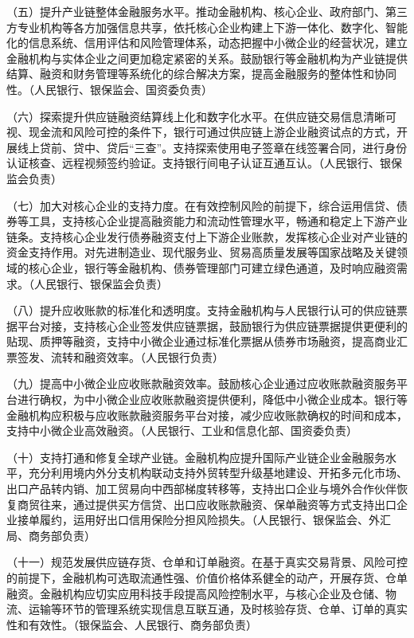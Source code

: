 （五）提升产业链整体金融服务水平。推动金融机构、核心企业、政府部门、第三方专业机构等各方加强信息共享，依托核心企业构建上下游一体化、数字化、智能化的信息系统、信用评估和风险管理体系，动态把握中小微企业的经营状况，建立金融机构与实体企业之间更加稳定紧密的关系。鼓励银行等金融机构为产业链提供结算、融资和财务管理等系统化的综合解决方案，提高金融服务的整体性和协同性。（人民银行、银保监会、国资委负责）

（六）探索提升供应链融资结算线上化和数字化水平。在供应链交易信息清晰可视、现金流和风险可控的条件下，银行可通过供应链上游企业融资试点的方式，开展线上贷前、贷中、贷后“三查”。支持探索使用电子签章在线签署合同，进行身份认证核查、远程视频签约验证。支持银行间电子认证互通互认。（人民银行、银保监会负责）

（七）加大对核心企业的支持力度。在有效控制风险的前提下，综合运用信贷、债券等工具，支持核心企业提高融资能力和流动性管理水平，畅通和稳定上下游产业链条。支持核心企业发行债券融资支付上下游企业账款，发挥核心企业对产业链的资金支持作用。对先进制造业、现代服务业、贸易高质量发展等国家战略及关键领域的核心企业，银行等金融机构、债券管理部门可建立绿色通道，及时响应融资需求。（人民银行、银保监会负责）

（八）提升应收账款的标准化和透明度。支持金融机构与人民银行认可的供应链票据平台对接，支持核心企业签发供应链票据，鼓励银行为供应链票据提供更便利的贴现、质押等融资，支持中小微企业通过标准化票据从债券市场融资，提高商业汇票签发、流转和融资效率。（人民银行负责）

（九）提高中小微企业应收账款融资效率。鼓励核心企业通过应收账款融资服务平台进行确权，为中小微企业应收账款融资提供便利，降低中小微企业成本。银行等金融机构应积极与应收账款融资服务平台对接，减少应收账款确权的时间和成本，支持中小微企业高效融资。（人民银行、工业和信息化部、国资委负责）

（十）支持打通和修复全球产业链。金融机构应提升国际产业链企业金融服务水平，充分利用境内外分支机构联动支持外贸转型升级基地建设、开拓多元化市场、出口产品转内销、加工贸易向中西部梯度转移等，支持出口企业与境外合作伙伴恢复商贸往来，通过提供买方信贷、出口应收账款融资、保单融资等方式支持出口企业接单履约，运用好出口信用保险分担风险损失。（人民银行、银保监会、外汇局、商务部负责）

（十一）规范发展供应链存货、仓单和订单融资。在基于真实交易背景、风险可控的前提下，金融机构可选取流通性强、价值价格体系健全的动产，开展存货、仓单融资。金融机构应切实应用科技手段提高风险控制水平，与核心企业及仓储、物流、运输等环节的管理系统实现信息互联互通，及时核验存货、仓单、订单的真实性和有效性。（银保监会、人民银行、商务部负责）

